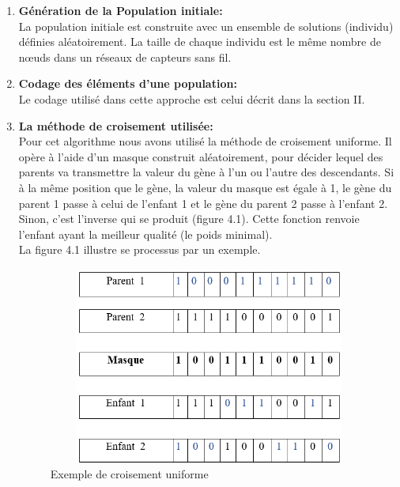 \begin{enumerate}[label=\alph*)]
	\item \textbf{Génération de la Population initiale:}\\
	La population initiale est construite avec un ensemble de solutions (individu) définies aléatoirement. La taille de chaque individu est le même nombre de nœuds dans un réseaux de capteurs sans fil.


	\item \textbf{Codage des éléments d’une population: }\\
	Le codage utilisé dans cette approche est celui décrit dans la section II.
	
	\item \textbf{La méthode de croisement utilisée:}\\
	Pour cet algorithme nous avons utilisé la méthode de croisement uniforme. Il opère à l’aide d’un masque construit aléatoirement, pour décider lequel des parents va transmettre  la valeur du gène à l’un ou l’autre des descendants. Si à la même position que le gène, la valeur du masque est égale à 1, le gène du parent 1 passe à celui de l’enfant 1 et le gène du parent 2 passe à l’enfant 2. Sinon, c’est l’inverse qui se produit (figure 4.1). Cette fonction renvoie l’enfant ayant la meilleur qualité (le poids minimal).\\
La figure 4.1  illustre se processus par un exemple.

\begin{figure}[H]
	\centering
	\includegraphics[width=12cm,height=6.5cm]{Chap4/1.png}
	\caption{Exemple de croisement uniforme}
	\label{fig:CSF}
\end{figure}
	

\end{enumerate}


